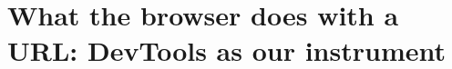 \chapter{What the browser does with a URL: DevTools as our instrument}
\label{ch:what-the-browser-does-with-a-url}

